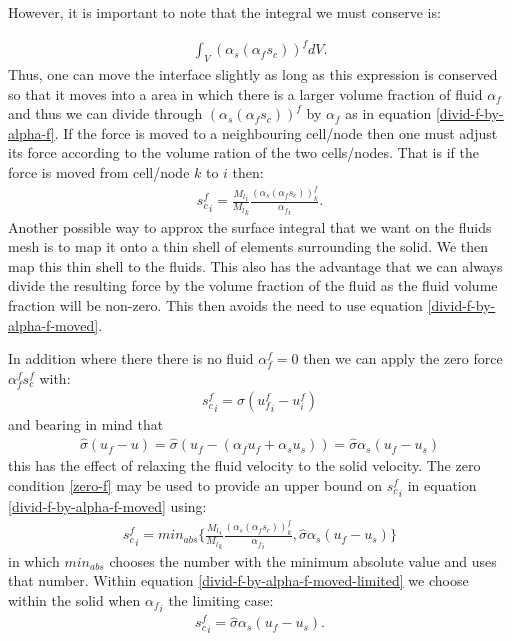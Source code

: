 However, it is important to note that the integral we
must conserve is:

\begin{eqnarray}
\int_V (\alpha_s(\alpha_f s_c))^f dV.
\end{eqnarray}
Thus, one can move the interface slightly as long as this expression
is conserved so that it moves into a area in which there is a
larger volume fraction of fluid $\alpha_f$ and thus we
can divide through $(\alpha_s(\alpha_f s_c))^f$ by $\alpha_f$ as in equation
\ref{divid-f-by-alpha-f}. If the force is moved to a neighbouring cell/node
then one must adjust its force according to the volume ration
of the two cells/nodes. That is if the force is moved
from cell/node $k$ to $i$ then:
\begin{eqnarray}
{s_c^f}_i= \frac{{M_l}_i}{{M_l}_k} \frac{(\alpha_s(\alpha_f s_c))^f_k}{{\alpha_f}_i}.
\label{divid-f-by-alpha-f-moved}
\end{eqnarray}
Another possible way to approx the surface integral that we want on the
fluids mesh is to map it onto a thin shell of elements surrounding the solid.
We then map this thin shell to the fluids.
This also has the advantage that we can always divide the resulting force by the
volume fraction of the fluid as the fluid volume fraction will be non-zero.
This then avoids the need to use equation \ref{divid-f-by-alpha-f-moved}.


In addition where there there is no fluid $\alpha^f_f=0$ then
we can apply the zero force $\alpha^f_f s_c^f$ with:
\begin{eqnarray}
{s_c^f}_i= \hat\sigma ({u^f_f}_i-u^f_i)
\label{zero-f}
\end{eqnarray}
and bearing in mind that
\begin{eqnarray}
\hat\sigma (u_f-u)
= \hat\sigma (u_f - (\alpha_f u_f +\alpha_s u_s) )
= \hat\sigma \alpha_s(u_f-u_s)
\end{eqnarray}
this has the effect of relaxing
the fluid velocity to the solid velocity.
The zero condition \ref{zero-f}
may be used to provide an upper bound
on ${s_c^f}_i$ in equation \ref{divid-f-by-alpha-f-moved} using:
\begin{eqnarray}
{s_c^f}_i= min_{abs}\{ \frac{{M_l}_i}{{M_l}_k} \frac{(\alpha_s(\alpha_f s_c))^f_k}{{\alpha_f}_i},  \hat\sigma \alpha_s(u_f-u_s)  \}
\label{divid-f-by-alpha-f-moved-limited}
\end{eqnarray}
in which $min_{abs}$ chooses the number with the
minimum absolute value and uses that number.
Within equation \ref{divid-f-by-alpha-f-moved-limited} we choose
within the solid when ${\alpha_f}_i$ the limiting case:
\begin{eqnarray}
{s_c^f}_i=  \hat\sigma \alpha_s(u_f-u_s).
\label{s-c-simple}
\end{eqnarray}


